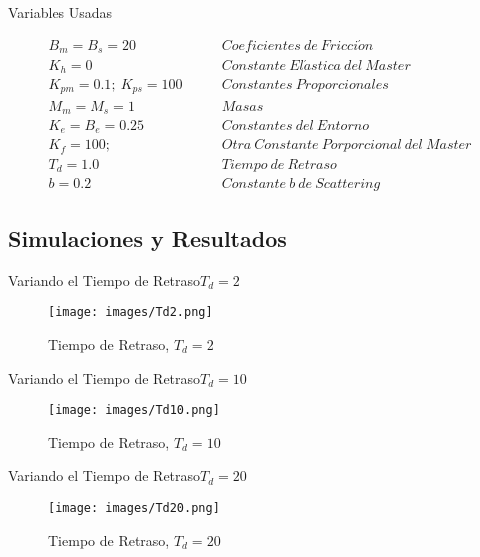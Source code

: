 \documentclass{beamer}
\begin{document}
\begin{frame}{Variables Usadas}
	
	\begin{equation}
		\begin{split}
		B_m = B_s = 20 \qquad &Coeficientes\ de\ Fricci\acute{o}n\\
		K_h = 0 \qquad &Constante\ El\acute{a}stica\ del\ Master\\
		K_{pm} = 0.1;\ K_{ps} = 100 \qquad &Constantes\ Proporcionales\\
		M_m = M_s = 1 \qquad &Masas\\
		K_e = B_e = 0.25 \qquad &Constantes\ del \ Entorno\\
		K_f = 100; 	\qquad &Otra\ Constante\ Porporcional\ del\ Master\\
		T_d = 1.0 \qquad &Tiempo\ de\ Retraso\\
		b = 0.2 \qquad &Constante\ b\ de\ Scattering
		\end{split}
	\end{equation}
	
\end{frame}

\subsection{Simulaciones y Resultados}

\begin{frame}{Variando el Tiempo de Retraso}{$T_d=2$}
	
	\begin{figure}[h!]
		\centering
		\texttt{[image: images/Td2.png]}
		\caption{Tiempo de Retraso, $T_d=2$}
		\label{TD2}
	\end{figure}
	
\end{frame}

\begin{frame}{Variando el Tiempo de Retraso}{$T_d=10$}
	
	\begin{figure}[h!]
		\centering
		\texttt{[image: images/Td10.png]}
		\caption{Tiempo de Retraso, $T_d=10$}
		\label{TD10}
	\end{figure}
	
\end{frame}

\begin{frame}{Variando el Tiempo de Retraso}{$T_d=20$}
	
	\begin{figure}[h!]
		\centering
		\texttt{[image: images/Td20.png]}
		\caption{Tiempo de Retraso, $T_d=20$}
		\label{TD20}
	\end{figure}
	
\end{frame}
\end{document}
